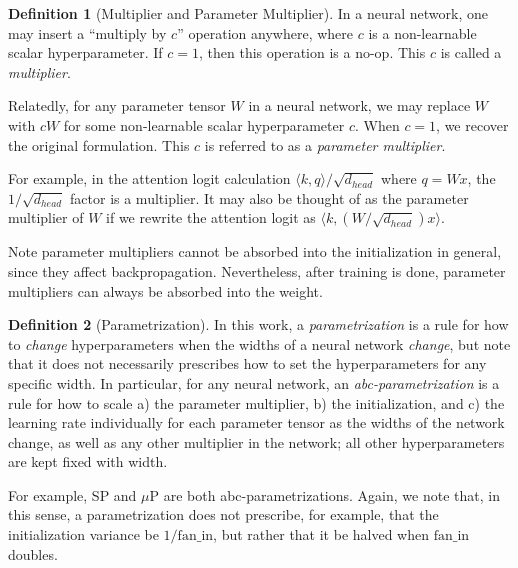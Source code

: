 \documentclass{article}
\theoremstyle{definition}
\newtheorem{defn}{Definition}[section]
\newcommand{\fanin}{\mathrm{fan\_in}}
\begin{document}
\begin{defn}[Multiplier and Parameter Multiplier]
  In a neural network, one may insert a ``multiply by $c$'' operation anywhere, where $c$ is a non-learnable scalar hyperparameter.
  If $c=1$, then this operation is a no-op.
  This $c$ is called a \emph{multiplier}.

  Relatedly, for any parameter tensor $W$ in a neural network, we may replace $W$ with $cW$ for some non-learnable scalar hyperparameter $c$.
  When $c=1$, we recover the original formulation.
  This $c$ is referred to as a \emph{parameter multiplier}.
\end{defn}
For example, in the attention logit calculation $\langle k, q\rangle/\sqrt{d_{head}}$ where $q = W x$, the $1/\sqrt{d_{head}}$ factor is a multiplier.
It may also be thought of as the parameter multiplier of $W$ if we rewrite the attention logit as $ \langle k, (W/\sqrt{d_{head}}) x\rangle$.

Note parameter multipliers cannot be absorbed into the initialization in general, since they affect backpropagation.
Nevertheless, after training is done, parameter multipliers can always be absorbed into the weight.

\begin{defn}[Parametrization]
  In this work, a \emph{parametrization} is a rule for how to \emph{change} hyperparameters when the widths of a neural network \emph{change}, but note that it does not necessarily prescribes how to set the hyperparameters for any specific width.
  In particular, for any neural network, an \emph{abc-parametrization} is a rule for how to scale a) the parameter multiplier, b) the initialization, and c) the learning rate individually for each parameter tensor as the widths of the network change, as well as any other multiplier in the network; all other hyperparameters are kept fixed with width.
\end{defn}
For example, SP and $\mu$P are both abc-parametrizations.
Again, we note that, in this sense, a parametrization does not prescribe, for example, that the initialization variance be $1/\fanin$, but rather that it be halved when $\fanin$ doubles.
\end{document}
